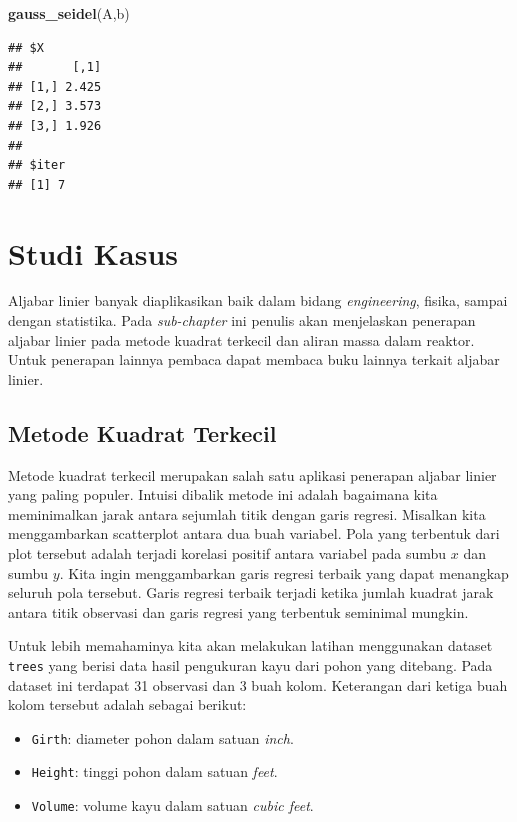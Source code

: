 \documentclass[]{book}
\newenvironment{Shaded}{\begin{snugshade}}{\end{snugshade}}
\newcommand{\KeywordTok}[1]{\textcolor[rgb]{0.13,0.29,0.53}{\textbf{#1}}}
\newcommand{\NormalTok}[1]{#1}
\providecommand{\tightlist}{%
  \setlength{\itemsep}{0pt}\setlength{\parskip}{0pt}}
\theoremstyle{definition}
\theoremstyle{definition}
\theoremstyle{definition}
\theoremstyle{remark}
\begin{document}
\begin{Shaded}
\begin{Highlighting}[]
\KeywordTok{gauss_seidel}\NormalTok{(A,b)}
\end{Highlighting}
\end{Shaded}

\begin{verbatim}
## $X
##       [,1]
## [1,] 2.425
## [2,] 3.573
## [3,] 1.926
## 
## $iter
## [1] 7
\end{verbatim}

\hypertarget{studikasus}{%
\section{Studi Kasus}\label{studikasus}}

Aljabar linier banyak diaplikasikan baik dalam bidang \emph{engineering}, fisika, sampai dengan statistika. Pada \emph{sub-chapter} ini penulis akan menjelaskan penerapan aljabar linier pada metode kuadrat terkecil dan aliran massa dalam reaktor. Untuk penerapan lainnya pembaca dapat membaca buku lainnya terkait aljabar linier.

\hypertarget{leastsquare}{%
\subsection{Metode Kuadrat Terkecil}\label{leastsquare}}

Metode kuadrat terkecil merupakan salah satu aplikasi penerapan aljabar linier yang paling populer. Intuisi dibalik metode ini adalah bagaimana kita meminimalkan jarak antara sejumlah titik dengan garis regresi. Misalkan kita menggambarkan scatterplot antara dua buah variabel. Pola yang terbentuk dari plot tersebut adalah terjadi korelasi positif antara variabel pada sumbu \(x\) dan sumbu \(y\). Kita ingin menggambarkan garis regresi terbaik yang dapat menangkap seluruh pola tersebut. Garis regresi terbaik terjadi ketika jumlah kuadrat jarak antara titik observasi dan garis regresi yang terbentuk seminimal mungkin.

Untuk lebih memahaminya kita akan melakukan latihan menggunakan dataset \texttt{trees} yang berisi data hasil pengukuran kayu dari pohon yang ditebang. Pada dataset ini terdapat 31 observasi dan 3 buah kolom. Keterangan dari ketiga buah kolom tersebut adalah sebagai berikut:

\begin{itemize}
\tightlist
\item
  \texttt{Girth}: diameter pohon dalam satuan \emph{inch}.
\item
  \texttt{Height}: tinggi pohon dalam satuan \emph{feet}.
\item
  \texttt{Volume}: volume kayu dalam satuan \emph{cubic feet}.
\end{itemize}
\end{document}
